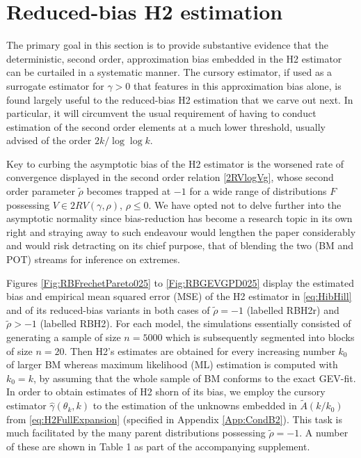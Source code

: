 \documentclass[11pt, a4paper, oneside]{article}
\numberwithin{equation}{section}
\theoremstyle{plain}
\theoremstyle{definition}
\begin{document}
   


\section{Reduced-bias H2 estimation}\label{Sec:RBH2}

The primary goal in this section is to provide substantive evidence that the deterministic, second order, approximation bias embedded in the H2 estimator can be curtailed in a systematic manner. The cursory estimator, if used as a surrogate estimator for $\gamma>0$ that features in this approximation bias alone, is found largely useful to the reduced-bias H2 estimation that we carve out next. In particular, it will circumvent the usual requirement of having to conduct estimation of the second order elements at a much lower threshold, usually advised of the order $2k/\log \log k$.  


Key to curbing the asymptotic bias of the H2 estimator is the worsened rate of convergence displayed in the second order relation \eqref{2RVlogVg}, whose second order parameter $\tilde{\rho}$ becomes trapped at $-1$ for a wide range of distributions $F$ possessing $V \in 2RV(\gamma, \rho)$, $\rho \leq 0$. We have opted not to delve further into the asymptotic normality since bias-reduction has become a research topic in its own right and straying away to such endeavour would lengthen the paper considerably and would risk detracting on its chief purpose, that  of blending the two (BM and POT) streams for inference on extremes.


Figures \ref{Fig:RBFrechetPareto025} to \ref{Fig:RBGEVGPD025} display the estimated bias and empirical mean squared error (MSE) of the H2 estimator in \eqref{eq:HibHill} and of its reduced-bias variants in both cases of $\tilde{\rho} = -1$ (labelled RBH2r) and $\tilde{\rho}> -1$ (labelled RBH2). For each model, the simulations essentially consisted of generating a sample of size $n=5000$ which is subsequently segmented into blocks of size $n=20$. Then H2's estimates are obtained for every increasing number $k_0$ of larger BM  whereas maximum likelihood (ML) estimation is computed with $k_0=k$, by assuming that the whole sample of BM conforms to the exact GEV-fit. In order to obtain estimates of H2 shorn of its bias, we employ the cursory estimator  $\hat{\gamma}(\theta_k, k)$  to the estimation of the unknowns embedded in $\tilde{A}(k/k_0)$ from \eqref{eq:H2FullExpansion} (specified in Appendix \ref{App:CondB2}). This task is much facilitated by the many parent distributions possessing $\tilde{\rho} = -1$. A number of these are shown in Table 1 as part of the accompanying supplement.
\end{document}
